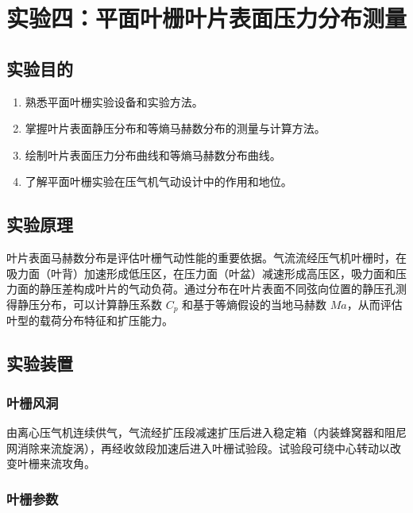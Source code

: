 
\section{实验四：平面叶栅叶片表面压力分布测量}

\subsection{实验目的}

\begin{enumerate}
    \item 熟悉平面叶栅实验设备和实验方法。
    \item 掌握叶片表面静压分布和等熵马赫数分布的测量与计算方法。
    \item 绘制叶片表面压力分布曲线和等熵马赫数分布曲线。
    \item 了解平面叶栅实验在压气机气动设计中的作用和地位。
\end{enumerate}

\subsection{实验原理}

叶片表面马赫数分布是评估叶栅气动性能的重要依据。气流流经压气机叶栅时，在吸力面（叶背）加速形成低压区，在压力面（叶盆）减速形成高压区，吸力面和压力面的静压差构成叶片的气动负荷。通过分布在叶片表面不同弦向位置的静压孔测得静压分布，可以计算静压系数 $C_p$ 和基于等熵假设的当地马赫数 $Ma$，从而评估叶型的载荷分布特征和扩压能力。

\subsection{实验装置}

\subsubsection{叶栅风洞}

由离心压气机连续供气，气流经扩压段减速扩压后进入稳定箱（内装蜂窝器和阻尼网消除来流旋涡），再经收敛段加速后进入叶栅试验段。试验段可绕中心转动以改变叶栅来流攻角。

\subsubsection{叶栅参数}

